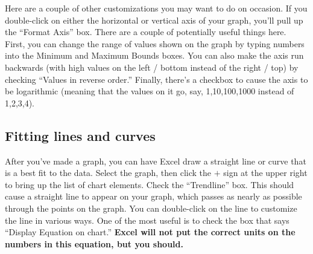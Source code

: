 Here are a couple of other customizations you may want to do on occasion.
If you double-click on either the horizontal or vertical axis
of your graph, you'll pull up the ``Format Axis'' box. There
are a couple of potentially useful things here. First, you can change
the range of values shown on the graph by
typing numbers into the Minimum and Maximum Bounds boxes.
You can also make the axis run backwards
(with high values on the left / bottom instead of the right / top) by
checking ``Values in reverse order.''
Finally, there's
a checkbox to cause the axis to be 
logarithmic (meaning that the values on it go, say, 1,10,100,1000
instead of 1,2,3,4). 

\pagebreak[3]
\subsection{Fitting lines and curves}


After you've made a graph, you can have Excel draw a straight line or
curve that is a best fit to the data.  Select the graph,
then click the $+$ sign at the upper right to bring up the
list of chart elements. Check the ``Trendline'' box.
This should cause a straight line to appear on your graph, which passes
as nearly as possible through the points on the graph.
You can double-click on the line to customize the line
in various ways. One of the most useful is to check the box that says
``Display Equation on chart.''
{\bf Excel will not put the correct units on the numbers in this equation,
but you should.}

